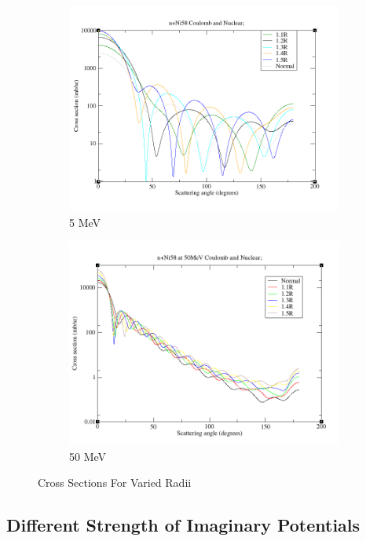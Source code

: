 \documentclass[paper=a4, fontsize=11pt]{scrartcl} %
\numberwithin{equation}{section} %
\numberwithin{figure}{section} %
\numberwithin{table}{section} %
\begin{document}
\begin{figure}[hbt]
\centering
\begin{subfigure}[b!]{.45\textwidth}
\includegraphics[width=\textwidth]{NeutronRad5.png}
\caption{5 MeV}
\end{subfigure}
\quad
\begin{subfigure}[b!]{.45\textwidth}
\includegraphics[width=\textwidth]{NeutronRad50.png}
\caption{50 MeV}
\end{subfigure}
\caption{Cross Sections For Varied Radii}
\end{figure}

\subsection{Different Strength of Imaginary Potentials}
\end{document}

